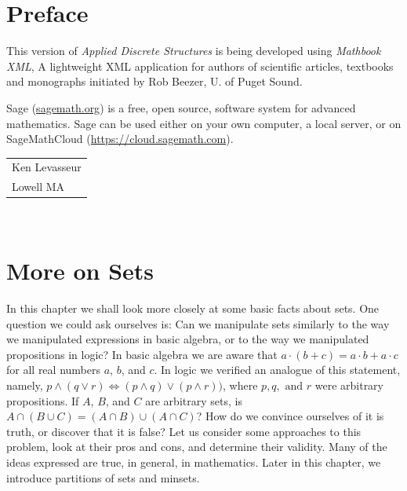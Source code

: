 \documentclass[10pt,]{book}
\theoremstyle{plain}
\theoremstyle{definition}
\theoremstyle{definition}
\theoremstyle{definition}
\begin{document}
\chapter*{Preface}\label{preface-1}
This version of \emph{Applied Discrete Structures} is being developed using \emph{Mathbook XML}, A lightweight XML application for authors of scientific articles, textbooks and monographs initiated by Rob Beezer, U. of Puget Sound.  %
\par
Sage (\href{http://sagemath.org}{sagemath.org}) is a free, open source, software system for advanced mathematics.  Sage can be used either on your own computer, a local server, or on SageMathCloud (\href{https://cloud.sagemath.com}{https://cloud.sagemath.com}). %
\par\hfill\begin{tabular}{l@{}}
Ken Levasseur\\
Lowell MA
\end{tabular}\\\par
\setcounter{tocdepth}{1}
\renewcommand*\contentsname{Contents}
\tableofcontents
\mainmatter
\typeout{************************************************}
\typeout{************************************************}
\chapter[More on Sets]{More on Sets}\label{chapter_4}
\typeout{************************************************}
\typeout{************************************************}

In this chapter we shall look more closely at some basic facts about sets. One question we could ask ourselves is: Can we manipulate sets similarly to the way we manipulated expressions in basic algebra, or to the way we manipulated propositions in logic? In basic algebra we are aware that \(a \cdot  (b + c) = a\cdot  b + a \cdot  c\) for all real numbers \(a\), \(b\), and \(c\). In logic we verified an analogue of this statement, namely, \(p
\land  ( q \lor  r) \Leftrightarrow  (p \land  q)\lor  (p \land  r))\), where \(p, q, \textrm{ and } r\) were arbitrary propositions. If \(A\), \(B\), and \(C\) are arbitrary sets, is \(A \cap  (B \cup  C) = (A \cap  B) \cup  (A \cap  C)\)? How do we convince ourselves of it is truth, or discover that it is false? Let us consider some approaches to this problem, look at their pros and cons, and determine their validity. Many of the ideas expressed are true, in general, in mathematics. Later in this chapter, we introduce partitions of sets and minsets.
%
\typeout{************************************************}
\typeout{************************************************}
\end{document}
